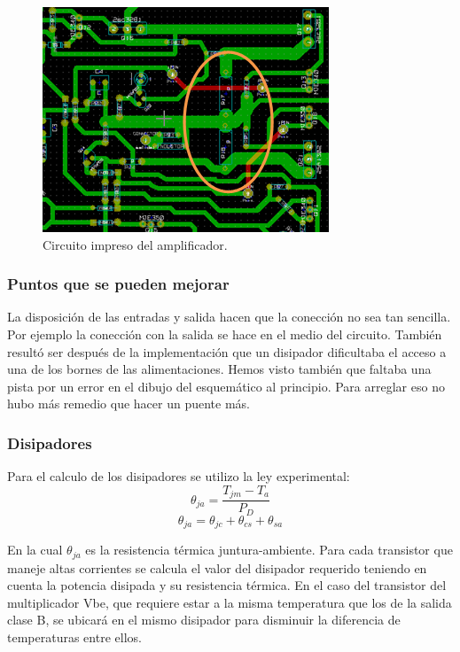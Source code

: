 \begin{figure}[H]
\centering
\includegraphics[scale=0.8]{img/eschema3.png}
\caption{Circuito impreso del amplificador.}
\end{figure}

\subsubsection*{Puntos que se pueden mejorar}
La disposición de las entradas y salida hacen que la conección no sea tan sencilla. Por ejemplo la conección con la salida se hace en el medio del circuito. También resultó ser después de la implementación que un disipador dificultaba el acceso a una de los bornes de las alimentaciones. 
Hemos visto también que faltaba una pista por un error en el dibujo del esquemático al principio. Para arreglar eso no hubo más remedio que hacer un puente más.

\subsubsection{Disipadores}
\bigskip
Para el calculo de los disipadores se utilizo la ley experimental:
$$
   \theta_{ja}=\dfrac{T_{jm}-T_a}{P_D}
$$
$$
	\theta_{ja}=\theta_{jc}+\theta_{cs}+\theta_{sa}
$$

En la cual $\theta_{ja}$ es la resistencia térmica juntura-ambiente. Para cada transistor que maneje altas corrientes se calcula el valor del disipador requerido teniendo en cuenta la potencia disipada y su resistencia térmica. En el caso del transistor del multiplicador Vbe, que requiere estar a la misma temperatura que los de la salida clase B, se ubicará en el mismo disipador para disminuir la diferencia de temperaturas entre ellos.

